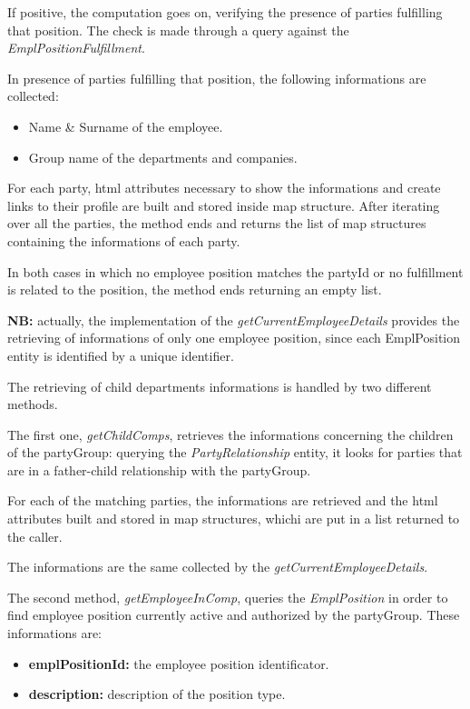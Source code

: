 If positive, the computation goes on, verifying the presence of parties fulfilling that position. The check is made through a query against the \textit{EmplPositionFulfillment}.

In presence of parties fulfilling that position, the following informations are collected:

\begin{itemize}
	\item Name \& Surname of the employee.
	\item Group name of the departments and companies.
\end{itemize}

For each party, html attributes necessary to show the informations and create links to their profile are built and stored inside map structure.
After iterating over all the parties, the method ends and returns the list of map structures containing the informations of each party.

In both cases in which no employee position matches the partyId or no fulfillment is related to the position, the method ends returning an empty list.

\textbf{NB:} actually, the implementation of the \textit{getCurrentEmployeeDetails} provides the retrieving of informations of only one employee position, since each EmplPosition entity is identified by a unique identifier.

The retrieving of child departments informations is handled by two different methods.

The first one, \textit{getChildComps}, retrieves the informations concerning the children of the partyGroup: querying the \textit{PartyRelationship} entity, it looks for parties that are in a father-child relationship with the partyGroup.

For each of the matching parties, the informations are retrieved and the html attributes built and stored in map structures, whichi are put in a list returned to the caller.

The informations are the same collected by the \textit{getCurrentEmployeeDetails}.

The second method, \textit{getEmployeeInComp}, queries the \textit{EmplPosition} in order to find employee position currently active and authorized by the partyGroup. These informations are:

\begin{itemize}
	\item \textbf{emplPositionId:} the employee position identificator.
	\item \textbf{description:} description of the position type.
\end{itemize}

